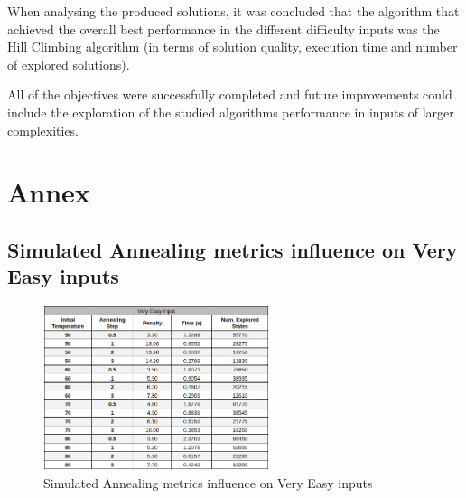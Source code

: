 \documentclass[conference]{IEEEtran}
\begin{document}
When analysing the produced solutions, it was concluded that the algorithm that achieved the overall best performance in the different difficulty inputs was the Hill Climbing algorithm (in terms of solution quality, execution time and number of explored solutions). 

All  of  the  objectives  were  successfully  completed  and future improvements could include the exploration of the studied algorithms performance in inputs of larger complexities.

\begin{thebibliography}{00}
    



\end{thebibliography}

\section{Annex} \label{sec:annex}

\subsection{Simulated Annealing metrics influence on Very Easy inputs}

\begin{figure}[H]
    \centerline{\includegraphics[width=250px]{annealing_very_easy.png}}
    \caption{Simulated Annealing metrics influence on Very Easy inputs}
\end{figure}
\end{document}
